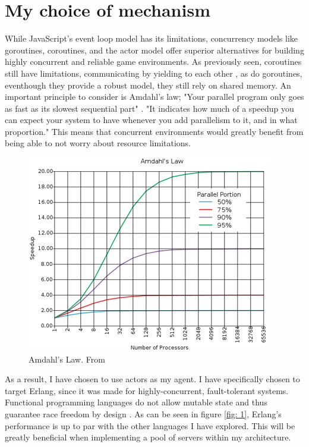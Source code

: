 \documentclass[]{final}
\begin{document}
\section{My choice of mechanism}
While JavaScript’s event loop model has its limitations, concurrency
models like goroutines, coroutines, and the actor model offer superior
alternatives for building highly concurrent and reliable game environments.
As previously seen, coroutines still have limitations, communicating by yielding
to each other \cite{noauthor_introconcurrency_nodate}, as do goroutines,
eventhough they provide a robust model, they still rely on shared memory.
An important principle to consider is Amdahl's law; "Your parallel program only goes as fast as its slowest sequential part" \cite{yang_c_nodate}.
"It indicates how much of a speedup you can expect your system to have whenever
you add parallelism to it, and in what proportion." \cite{yang_c_nodate}
This means that concurrent environments would greatly benefit from being able to
not worry about resource limitations.
\begin{figure}[ht!]
  \centering
  \includegraphics[width=0.7\linewidth]{amdahl}
  \vspace*{-0.3cm}
  \caption{Amdahl's Law. From \cite{noauthor_hitchhikers_nodate}}
  \label{fig: 0}
\end{figure}

As a result, I have chosen to use actors as my agent. I have specifically
chosen to target Erlang, since it was made for highly-concurrent, fault-tolerant
systems. Functional programming languages do not allow mutable state and thus
guarantee race freedom by design \cite{bianchi_survey_2018}.
As can be seen in figure \ref{fig: 1}, Erlang's performance is up to par with the
other languages I have explored. This will be greatly beneficial when implementing
a pool of servers within my architecture.
\end{document}
